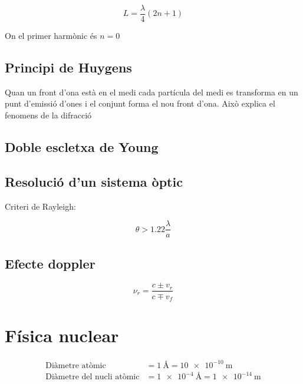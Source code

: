 \begin{equation}
    L = \frac{\lambda}{4}(2n+1)
\end{equation}

On el primer harmònic és $n=0$

\subsection{Principi de Huygens}
\label{sub:principi_de_huygens}

Quan un front d'ona està en el medi cada partícula del medi es transforma en
un punt d'emissió d'ones i el conjunt forma el nou front d'ona. Això explica el
fenomens de la difracció

\subsection{Doble escletxa de Young}
\label{sub:doble_escletxa_de_young}

\subsection{Resolució d'un sistema òptic}
\label{sub:resolucio_d_un_sistema_optic}

Criteri de Rayleigh:

\begin{equation}
    \theta > 1.22 \frac{\lambda}{a}
\end{equation}

\subsection{Efecte doppler}
\label{sub:efecte_doppler}

\begin{equation}
    \nu_r  = \frac{c \pm v_r}{c \mp v_f}
\end{equation}

\section{Física nuclear}
\label{sec:fisica_nuclear}

\begin{align}
    \text{Diàmetre atòmic} &= \SI{1}{\angstrom} = \SI{10e-10}{\metre} \\
    \text{Diàmetre del nucli atòmic} &= \SI{1e-4}{\angstrom} = \SI{1e-14}{\metre}
\end{align}


